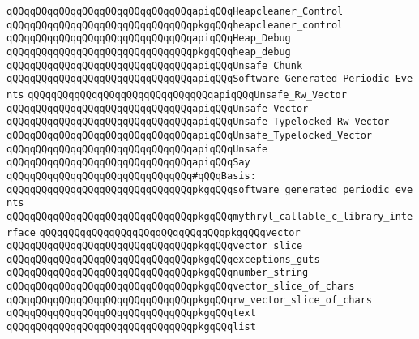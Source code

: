 \verb|qQQqqQQqqQQqqQQqqQQqqQQqqQQqqQQqapiqQQqHeapcleaner_Control|\newline
\verb|qQQqqQQqqQQqqQQqqQQqqQQqqQQqqQQqpkgqQQqheapcleaner_control|\newline
\newline
\verb|qQQqqQQqqQQqqQQqqQQqqQQqqQQqqQQqapiqQQqHeap_Debug|\newline
\verb|qQQqqQQqqQQqqQQqqQQqqQQqqQQqqQQqpkgqQQqheap_debug|\newline
\newline
\verb|qQQqqQQqqQQqqQQqqQQqqQQqqQQqqQQqapiqQQqUnsafe_Chunk|\newline
\verb|qQQqqQQqqQQqqQQqqQQqqQQqqQQqqQQqapiqQQqSoftware_Generated_Periodic_Events|\newline
\verb|qQQqqQQqqQQqqQQqqQQqqQQqqQQqqQQqapiqQQqUnsafe_Rw_Vector|\newline
\verb|qQQqqQQqqQQqqQQqqQQqqQQqqQQqqQQqapiqQQqUnsafe_Vector|\newline
\verb|qQQqqQQqqQQqqQQqqQQqqQQqqQQqqQQqapiqQQqUnsafe_Typelocked_Rw_Vector|\newline
\verb|qQQqqQQqqQQqqQQqqQQqqQQqqQQqqQQqapiqQQqUnsafe_Typelocked_Vector|\newline
\verb|qQQqqQQqqQQqqQQqqQQqqQQqqQQqqQQqapiqQQqUnsafe|\newline
\verb|qQQqqQQqqQQqqQQqqQQqqQQqqQQqqQQqapiqQQqSay|\newline
\newline
\verb|qQQqqQQqqQQqqQQqqQQqqQQqqQQqqQQq#qQQqBasis:|\newline
\verb|qQQqqQQqqQQqqQQqqQQqqQQqqQQqqQQqpkgqQQqsoftware_generated_periodic_events|\newline
\verb|qQQqqQQqqQQqqQQqqQQqqQQqqQQqqQQqpkgqQQqmythryl_callable_c_library_interface|\newline
\verb|qQQqqQQqqQQqqQQqqQQqqQQqqQQqqQQqpkgqQQqvector|\newline
\verb|qQQqqQQqqQQqqQQqqQQqqQQqqQQqqQQqpkgqQQqvector_slice|\newline
\verb|qQQqqQQqqQQqqQQqqQQqqQQqqQQqqQQqpkgqQQqexceptions_guts|\newline
\verb|qQQqqQQqqQQqqQQqqQQqqQQqqQQqqQQqpkgqQQqnumber_string|\newline
\verb|qQQqqQQqqQQqqQQqqQQqqQQqqQQqqQQqpkgqQQqvector_slice_of_chars|\newline
\verb|qQQqqQQqqQQqqQQqqQQqqQQqqQQqqQQqpkgqQQqrw_vector_slice_of_chars|\newline
\verb|qQQqqQQqqQQqqQQqqQQqqQQqqQQqqQQqpkgqQQqtext|\newline
\verb|qQQqqQQqqQQqqQQqqQQqqQQqqQQqqQQqpkgqQQqlist|\newline

